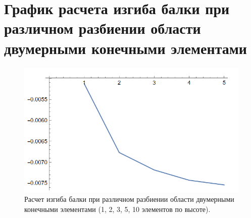 \documentclass[12pt,a4paper]{article}
\begin{document}
    \section { График расчета изгиба балки при различном разбиении области двумерными
    	конечными элементами }
    \begin{figure}[h]
    	\centering
    	\includegraphics[width=1\textwidth]{graph.PNG}
    	\caption{Расчет изгиба балки при различном разбиении области двумерными
    		конечными элементами (1, 2, 3, 5, 10 элементов по высоте).}
    \end{figure}
\end{document}
